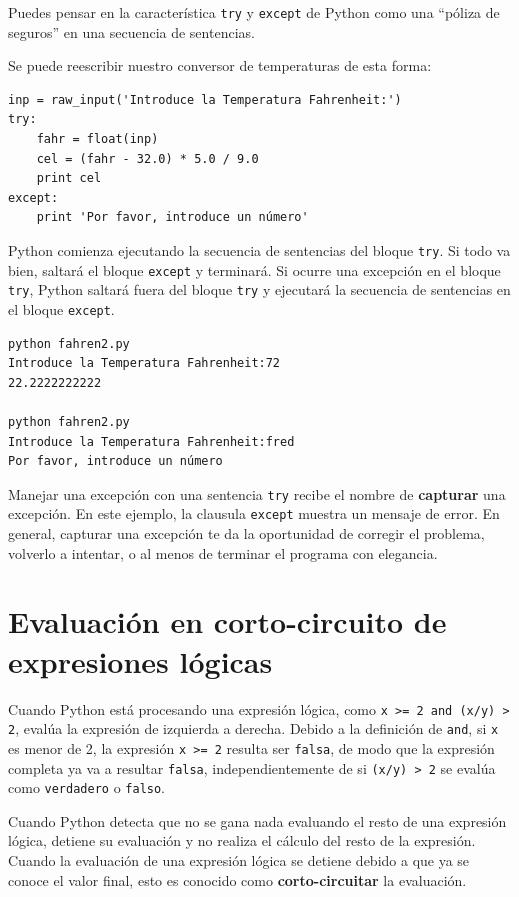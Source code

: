 Puedes pensar en la característica {\tt try} y {\tt except}
de Python como una ``póliza de seguros'' en una secuencia
de sentencias.

Se puede reescribir nuestro conversor de temperaturas de esta forma:

\beforeverb
\begin{verbatim}
inp = raw_input('Introduce la Temperatura Fahrenheit:')
try:
    fahr = float(inp)
    cel = (fahr - 32.0) * 5.0 / 9.0
    print cel
except:
    print 'Por favor, introduce un número'
\end{verbatim}
\afterverb
%

Python comienza ejecutando la
secuencia de sentencias del bloque
{\tt try}. Si todo va bien,
saltará el bloque {\tt except} y terminará.
Si ocurre una excepción en el bloque {\tt try},
Python saltará fuera del bloque {\tt try} y
ejecutará la secuencia de sentencias en el bloque {\tt except}.

\beforeverb
\begin{verbatim}
python fahren2.py 
Introduce la Temperatura Fahrenheit:72
22.2222222222

python fahren2.py 
Introduce la Temperatura Fahrenheit:fred
Por favor, introduce un número
\end{verbatim}
\afterverb
%

Manejar una excepción con una sentencia {\tt try} recibe el nombre de
{\bf capturar} una excepción. En este ejemplo, la clausula {\tt except}
muestra un mensaje de error. En general,
capturar una excepción te da la oportunidad de corregir el problema,
volverlo a intentar, o al menos de terminar el programa con elegancia.

\section{Evaluación en corto-circuito de expresiones lógicas}

Cuando Python está procesando una expresión lógica, como
{\tt x >= 2 and (x/y) > 2}, evalúa la expresión de
izquierda a derecha. Debido a la definición de {\tt and},
si {\tt x} es menor de 2, la expresión {\tt x >= 2} resulta ser
{\tt falsa}, de modo que la expresión completa ya va a resultar {\tt falsa}, independientemente
de si {\tt (x/y) > 2} se evalúa como {\tt verdadero} o {\tt falso}.

Cuando Python detecta que no se gana nada evaluando
el resto de una expresión lógica, detiene su evaluación y no
realiza el cálculo del resto de la expresión.
Cuando la evaluación de una expresión lógica se detiene debido a que
ya se conoce el valor final, esto es conocido como {\bf corto-circuitar}
la evaluación.

